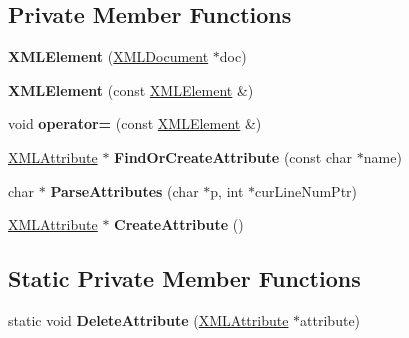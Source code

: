 \subsection*{Private Member Functions}
\begin{DoxyCompactItemize}
\item 
\mbox{\label{classtinyxml2_1_1XMLElement_a52484940e20f3734e6edc5e5c3af2dbc}} 
{\bfseries X\+M\+L\+Element} (\mbox{\hyperlink{classtinyxml2_1_1XMLDocument}{X\+M\+L\+Document}} $\ast$doc)
\item 
\mbox{\label{classtinyxml2_1_1XMLElement_a1aa8ab977a1799bf118efb158248351b}} 
{\bfseries X\+M\+L\+Element} (const \mbox{\hyperlink{classtinyxml2_1_1XMLElement}{X\+M\+L\+Element}} \&)
\item 
\mbox{\label{classtinyxml2_1_1XMLElement_ae300366701a54d4b6d1c287d9b5209a7}} 
void {\bfseries operator=} (const \mbox{\hyperlink{classtinyxml2_1_1XMLElement}{X\+M\+L\+Element}} \&)
\item 
\mbox{\label{classtinyxml2_1_1XMLElement_a4463788edbc3130f5f68eb732b9f323d}} 
\mbox{\hyperlink{classtinyxml2_1_1XMLAttribute}{X\+M\+L\+Attribute}} $\ast$ {\bfseries Find\+Or\+Create\+Attribute} (const char $\ast$name)
\item 
\mbox{\label{classtinyxml2_1_1XMLElement_aed7b1dc1e5862824f9995687b05fa6eb}} 
char $\ast$ {\bfseries Parse\+Attributes} (char $\ast$p, int $\ast$cur\+Line\+Num\+Ptr)
\item 
\mbox{\label{classtinyxml2_1_1XMLElement_a49a3007807f58a8d68884eba2c2160d1}} 
\mbox{\hyperlink{classtinyxml2_1_1XMLAttribute}{X\+M\+L\+Attribute}} $\ast$ {\bfseries Create\+Attribute} ()
\end{DoxyCompactItemize}
\subsection*{Static Private Member Functions}
\begin{DoxyCompactItemize}
\item 
\mbox{\label{classtinyxml2_1_1XMLElement_af6af63c153c343cc71638375c4a2085d}} 
static void {\bfseries Delete\+Attribute} (\mbox{\hyperlink{classtinyxml2_1_1XMLAttribute}{X\+M\+L\+Attribute}} $\ast$attribute)
\end{DoxyCompactItemize}
